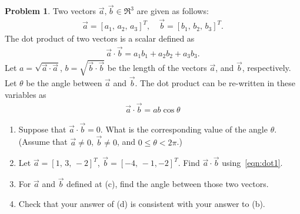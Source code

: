 \documentclass[10pt]{article}
\theoremstyle{definition}
\newtheorem{prob}{Problem}[section]
\newenvironment{subprob}%
{\renewcommand{\theenumi}{\alph{enumi}}\renewcommand{\labelenumi}{(\theenumi)}\begin{enumerate}}%
{\end{enumerate}}%
\begin{document}
\begin{prob}
Two vectors $\vec a,\vec b\in\Re^3$ are given as follows:
\begin{align*}
\vec a = [a_1,\,a_2,\, a_3]^T,\quad \vec b = [b_1,\,b_2,\, b_3]^T.
\end{align*}
The dot product of two vectors is a scalar defined as
\begin{align}
\vec a \cdot \vec b = a_1b_1+a_2b_2+a_3b_3.\label{eqn:dot1}
\end{align}
Let $a=\sqrt{\vec a \cdot \vec a}$,\; $b=\sqrt{\vec b \cdot \vec b}$\; be the length of the vectors $\vec a$, and $\vec b$, respectively. Let $\theta$ be the angle between $\vec a$ and $\vec b$. The dot product can be re-written in these variables as
\begin{align}
\vec a \cdot \vec b = a b \cos\theta
\end{align}

\begin{subprob}
\item Suppose that $\vec a\cdot\vec b =0$. What is the corresponding value of the angle $\theta$. (Assume that $\vec a\neq 0$, $\vec b\neq 0$, and $0\leq\theta < 2 \pi$.)
\item Let $\vec a = [1,\,3,\,-2]^T$, $\vec b =[-4,\,-1,-2]^T$. Find $\vec a \cdot \vec b$ using~\cref{eqn:dot1}.
\item For $\vec a$ and $\vec b$ defined at (c), find the angle between those two vectors.
\item Check that your answer of (d) is consistent with your answer to (b).
\end{subprob}


\end{prob}
\end{document}
